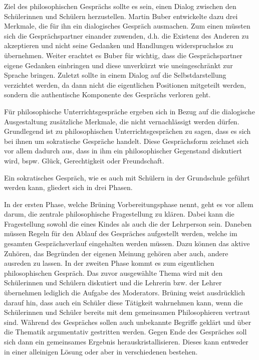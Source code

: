 Ziel des philosophischen Gesprächs sollte es sein, einen Dialog zwischen den Schülerinnen und Schülern herzustellen. 
Martin Buber entwickelte dazu drei Merkmale, die für ihn ein dialogisches Gespräch ausmachen. 
Zum einen müssten sich die Gesprächspartner einander zuwenden, d.h. die Existenz des Anderen zu akzeptieren und nicht seine Gedanken und Handlungen widerspruchslos zu übernehmen\cite{MB15, S.106}.
Weiter erachtet es Buber für wichtig, dass die Gesprächspartner eigene Gedanken einbringen und diese unverkürzt wie uneingeschränkt zur Sprache bringen. 
Zuletzt sollte in einem Dialog auf die Selbstdarstellung verzichtet werden, da dann nicht die eigentlichen Positionen mitgeteilt werden, sondern die authentische Komponente des Gesprächs verloren geht.

Für philosophische Unterrichtsgespräche ergeben sich in Bezug auf die dialogische Ausgestaltung zusätzliche Merkmale, die nicht vernachlässigt werden dürfen. 
Grundlegend ist zu philosophischen Unterrichtsgesprächen zu sagen, dass es sich bei ihnen um sokratische Gespräche handelt. 
Diese Gesprächsform zeichnet sich vor allem dadurch aus, \glqq dass in ihm ein philosophischer Gegenstand diskutiert wird, bspw. Glück, Gerechtigkeit oder Freundschaft.\grqq{}\cite{BB10, S.27}

Ein sokratisches Gespräch, wie es auch mit Schülern in der Grundschule geführt werden kann, gliedert sich in drei Phasen. 

In der ersten Phase, welche Brüning Vorbereitungsphase nennt, geht es vor allem darum, die zentrale philosophische Fragestellung zu klären. 
Dabei kann die Fragestellung sowohl die eines Kindes als auch die der Lehrperson sein. 
Daneben müssen Regeln für den Ablauf des Gespräches aufgestellt werden, welche im gesamten Gesprächsverlauf eingehalten werden müssen. 
Dazu können das aktive Zuhören, das Begründen der eigenen Meinung gehören aber auch, andere ausreden zu lassen\cite{BB10, S.31}.
In der zweiten Phase kommt es zum eigentlichen philosophischen Gespräch. 
Das zuvor ausgewählte Thema wird mit den Schülerinnen und Schülern diskutiert und die Lehrerin bzw. der Lehrer übernehmen lediglich die Aufgabe des Moderators. 
Brüning weist ausdrücklich darauf hin, dass auch ein Schüler diese Tätigkeit wahrnehmen kann, wenn die Schülerinnen und Schüler bereits mit dem gemeinsamen Philosophieren vertraut sind. 
Während des Gespräches sollen auch unbekannte Begriffe geklärt und über die Thematik argumentativ gestritten werden. 
Gegen Ende des Gespräches soll sich dann ein gemeinsames Ergebnis herauskristallisieren. 
Dieses kann entweder in einer alleinigen Lösung oder aber in verschiedenen bestehen. 

